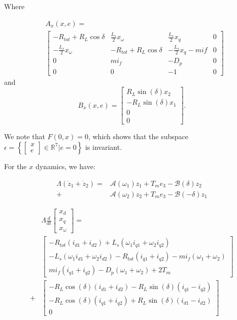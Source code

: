 \documentclass[letterpaper, 10 pt, conference]{ieeeconf}  %
\begin{document}
Where 

$$
\begin{aligned}
&A_x\left(x,e\right)  = \\ & \left[\begin{array}{cccc}
-R_{tot}+R_{L}\cos\delta & \frac{L_{s}}{2}x_{\omega} & \frac{L_{s}}{2}x_{q} & 0\\
-\frac{L_{s}}{2}x_{\omega} & -R_{tot}+R_{L}\cos\delta & -\frac{L_{s}}{2}x_{q}-mif & 0\\
0 & mi_{f} & -D_{p} & 0\\
0 & 0 & -1 & 0
\end{array}\right]
\end{aligned}
$$ 
and
$$
B_x\left(x,e\right) = 
\left[\begin{array}{c}
R_{L}\sin(\delta)x_{2}\\
-R_{L}\sin(\delta)x_{1}\\
0\\
0
\end{array}\right].
$$



We note that $F(0,x)=0$, which shows that the subspace
$\epsilon=\left\{ \left[\begin{array}{c}
x\\
e
\end{array}\right]\in\mathbb{R}^{7}|e=0\right\} $ is invariant.

For the $x$ dynamics, we have:

$$
\begin{aligned}
\Lambda(\dot{z}_{1}+\dot{z}_{2})= & \mathcal{A}(\omega_{1})z_{1}+T_{m}e_{3}-\mathcal{B}(\delta)z_{2}\\+&\mathcal{A}(\omega_{2})z_{2}  +T_{m}e_{3}-\mathcal{B}(-\delta)z_{1}
\end{aligned}
$$

$$
\begin{aligned}
&\Lambda\frac{d}{dt}\left[\begin{array}{c}
x_{d}\\
x_{q}\\
x_{\omega}
\end{array}\right]  = \\
 & \left[\begin{array}{c}
-R_{tot}(i_{d1}+i_{d2})+L_{s}(\omega_{1}i_{q1}+\omega_{2}i_{q2})\\
-L_{s}(\omega_{1}i_{d1}+\omega_{2}i_{d2})-R_{tot}(i_{q1}+i_{q2})-mi_{f}(\omega_{1}+\omega_{2})\\
mi_{f}(i_{q1}+i_{q2})-D_{p}(\omega_{1}+\omega_{2})+2T_{m}
\end{array}\right]\\
 +& \left[\begin{array}{c}
-R_{L}\cos(\delta)(i_{d1}+i_{d2})-R_{L}\sin(\delta)(i_{q1}-i_{q2})\\
-R_{L}\cos(\delta)(i_{q1}+i_{q2})+R_{L}\sin(\delta)(i_{d1}-i_{d2})\\
0
\end{array}\right]
\end{aligned}
$$
\end{document}
